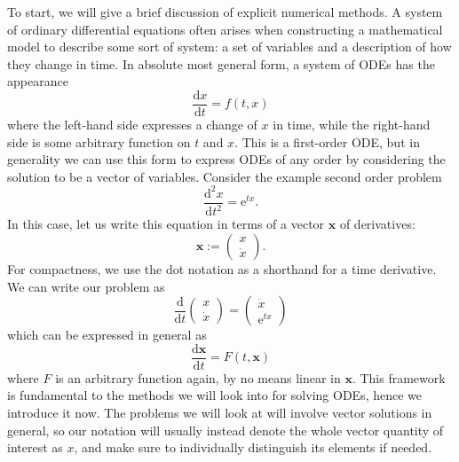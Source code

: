 \documentclass{report}
\theoremstyle{exampstyle} \newtheorem{example}[theorem]{Example}
\theoremstyle{exampstyle} \newtheorem{remark}[theorem]{Remark}
\theoremstyle{exampstyle} \newtheorem{definition}[theorem]{Definition}
\theoremstyle{exampstyle} \newtheorem{lemma}[theorem]{Lemma}
\begin{document}
To start, we will give a brief discussion of explicit numerical methods.
A system of ordinary differential equations often arises when constructing a mathematical model to describe some sort of system: a set of variables and a description of how they change in time.
In absolute most general form, a system of ODEs has the appearance
\begin{equation}
    \frac{\mathrm{d}x}{\mathrm{d}t} = f(t,x)
\end{equation}
where the left-hand side expresses a change of $x$ in time, while the right-hand side is some arbitrary function on $t$ and $x$.
This is a first-order ODE, but in generality we can use this form to express ODEs of any order by considering the solution to be a vector of variables.
Consider the example second order problem
\begin{equation*}
    \frac{\mathrm{d}^2 x}{\mathrm{d}t^2} = \mathrm{e}^{tx}.
\end{equation*}
In this case, let us write this equation in terms of a vector $\mathbf{x}$ of derivatives:
\begin{equation*}
    \mathbf{x} := \begin{pmatrix}
        x \\
        \dot{x}
    \end{pmatrix}.
\end{equation*}
For compactness, we use the dot notation as a shorthand for a time derivative.
We can write our problem as
\begin{equation*}
    \frac{\mathrm{d}}{\mathrm{d}t} \begin{pmatrix}
        x \\
        \dot{x}
    \end{pmatrix} = \begin{pmatrix}
        \dot{x} \\
        \mathrm{e}^{tx}
    \end{pmatrix}
\end{equation*}
which can be expressed in general as
\begin{equation*}
    \frac{\mathrm{d}\mathbf{x}}{\mathrm{d}t} = F(t,\mathbf{x})
\end{equation*}
where $F$ is an arbitrary function again, by no means linear in $\mathbf{x}$.
This framework is fundamental to the methods we will look into for solving ODEs, hence we introduce it now.
The problems we will look at will involve vector solutions in general, so our notation will usually instead denote the whole vector quantity of interest as $x$,
and make sure to individually distinguish its elements if needed.
\end{document}
